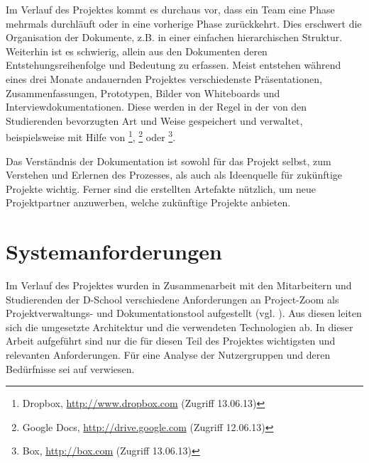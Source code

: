 Im Verlauf des Projektes kommt es durchaus vor, dass ein Team eine Phase mehrmals durchläuft oder in eine vorherige Phase zurückkehrt. Dies erschwert die Organisation der Dokumente, z.B. in einer einfachen hierarchischen Struktur. Weiterhin ist es schwierig, allein aus den Dokumenten deren Entstehungsreihenfolge und Bedeutung zu erfassen. Meist entstehen während eines drei Monate andauernden Projektes verschiedenste Präsentationen, Zusammenfassungen, Prototypen, Bilder von Whiteboards und Interviewdokumentationen. Diese werden in der Regel in der von den Studierenden bevorzugten Art und Weise gespeichert und verwaltet, beispielsweise mit Hilfe von \footnote{Dropbox, \url{http://www.dropbox.com} (Zugriff 13.06.13)}, \footnote{Google Docs, \url{http://drive.google.com} (Zugriff 12.06.13)} oder \footnote{Box, \url{http://box.com} (Zugriff 13.06.13)}.

Das Verständnis der Dokumentation ist sowohl für das Projekt selbst, zum Verstehen und Erlernen des Prozesses, als auch als Ideenquelle für zukünftige Projekte wichtig. Ferner sind die erstellten Artefakte nützlich, um neue Projektpartner anzuwerben, welche zukünftige Projekte anbieten. 

\section{Systemanforderungen}
\label{sec:requirements}

Im Verlauf des Projektes wurden in Zusammenarbeit mit den Mitarbeitern und Studierenden der D-School verschiedene Anforderungen an Project-Zoom als Projektverwaltungs- und Dokumentationstool aufgestellt (vgl. \cite{requirements}).  Aus diesen leiten sich die umgesetzte Architektur und die verwendeten Technologien ab. In dieser Arbeit aufgeführt sind nur die für diesen Teil des Projektes wichtigsten und relevanten Anforderungen. Für eine Analyse der Nutzergruppen und deren Bedürfnisse sei auf \cite{requirements}  verwiesen.

